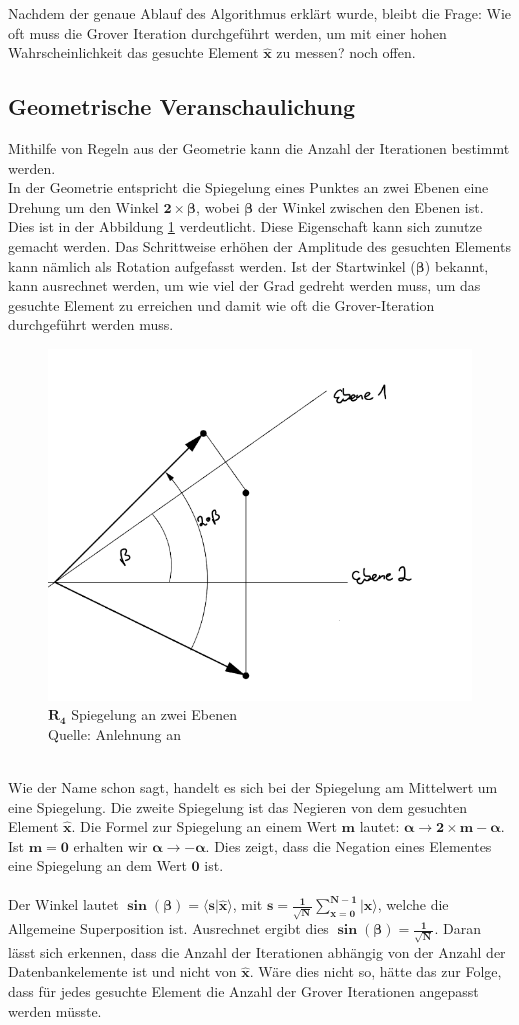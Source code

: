 Nachdem der genaue Ablauf des Algorithmus erklärt wurde, bleibt die Frage: Wie oft muss die Grover Iteration durchgeführt werden, um mit einer hohen Wahrscheinlichkeit das gesuchte Element $\mathbf{\hat{x}}$ zu messen? noch offen.

\subsection{Geometrische Veranschaulichung}
Mithilfe von Regeln aus der Geometrie kann die Anzahl der Iterationen bestimmt werden.
\\
In der Geometrie entspricht die Spiegelung eines Punktes an zwei Ebenen eine Drehung um den Winkel $\mathbf{2 \times \beta}$, wobei $\mathbf{\beta}$ der Winkel zwischen den Ebenen ist. Dies ist in der Abbildung \ref{fig:zweiEbenen} verdeutlicht. Diese Eigenschaft kann sich zunutze gemacht werden. Das Schrittweise erhöhen der Amplitude des gesuchten Elements kann nämlich als Rotation aufgefasst werden. Ist der Startwinkel ($\mathbf{\beta}$) bekannt, kann ausrechnet werden, um wie viel der Grad gedreht werden muss, um das gesuchte Element zu erreichen und damit wie oft die Grover-Iteration durchgeführt werden muss.
\begin{figure}[hbtp]
	\centering
	\includegraphics[width=.6\textwidth]{figures/zweiEbenen.png}
	\caption{$\mathbf{R_4}$ Spiegelung an zwei Ebenen \\ Quelle: Anlehnung an \cite[S. 149]{Ho17}}
	\label{fig:zweiEbenen}
\end{figure} 
\noindent
\\
Wie der Name schon sagt, handelt es sich bei der Spiegelung am Mittelwert um eine Spiegelung. Die zweite Spiegelung ist das Negieren von dem gesuchten Element $\mathbf{\hat{x}}$. Die Formel zur Spiegelung an einem Wert $\mathbf{m}$ lautet: $\mathbf{\alpha \rightarrow 2 \times m - \alpha}$. Ist $\mathbf{m=0}$ erhalten wir $\mathbf{\alpha \rightarrow - \alpha}$. Dies zeigt, dass die Negation eines Elementes eine Spiegelung an dem Wert $\mathbf{0}$ ist.
\\ 
\\
Der Winkel lautet $\mathbf{\sin(\beta) = \langle s | \hat{x} \rangle}$, mit $\mathbf{s = \frac{1}{\sqrt{N}}\sum\limits_{x=0}^{N-1}|x\rangle}$, welche die Allgemeine Superposition ist. Ausrechnet ergibt dies $\mathbf{\sin(\beta) = \frac{1}{\sqrt N}}$. Daran lässt sich erkennen, dass die Anzahl der Iterationen abhängig von der Anzahl der Datenbankelemente ist und nicht von $\mathbf{\hat{x}}$. Wäre dies nicht so, hätte das zur Folge, dass für jedes gesuchte Element die Anzahl der Grover Iterationen angepasst werden müsste.
